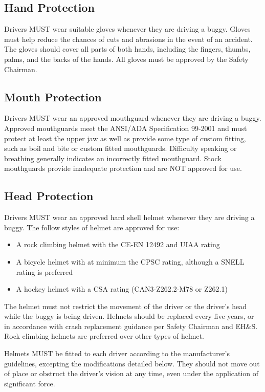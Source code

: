 \subsection{Hand Protection}

	Drivers MUST wear suitable gloves whenever they are driving a buggy. Gloves must help reduce the chances of cuts and abrasions in the event of an accident. The gloves should cover all parts of both hands, including the fingers, thumbs, palms, and the backs of the hands. All gloves must be approved by the Safety Chairman.

\subsection{Mouth Protection}

	Drivers MUST wear an approved mouthguard whenever they are driving a buggy. Approved mouthguards meet the ANSI/ADA Specification 99-2001 and must protect at least the upper jaw as well as provide some type of custom fitting, such as boil and bite or custom fitted mouthguards. Difficulty speaking or breathing generally indicates an incorrectly fitted mouthguard. Stock mouthguards provide inadequate protection and are NOT approved for use.

\subsection{Head Protection}

	Drivers MUST wear an approved hard shell helmet whenever they are driving a buggy. The follow styles of helmet are approved for use: 
	\begin{itemize}
		\item A rock climbing helmet with the CE-EN 12492 and UIAA rating
		\item A bicycle helmet with at minimum the CPSC rating, although a SNELL rating is preferred 
		\item A hockey helmet with a CSA rating (CAN3-Z262.2-M78 or Z262.1) 
	\end{itemize}

	The helmet must not restrict the movement of the driver or the driver's head while the buggy is being driven. Helmets should be replaced every five years, or in accordance with crash replacement guidance per Safety Chairman and EH&S. Rock climbing helmets are preferred over other types of helmet. 
	
	Helmets MUST be fitted to each driver according to the manufacturer's guidelines, excepting the modifications detailed below. They should not move out of place or obstruct the driver's vision at any time, even under the application of significant force.

